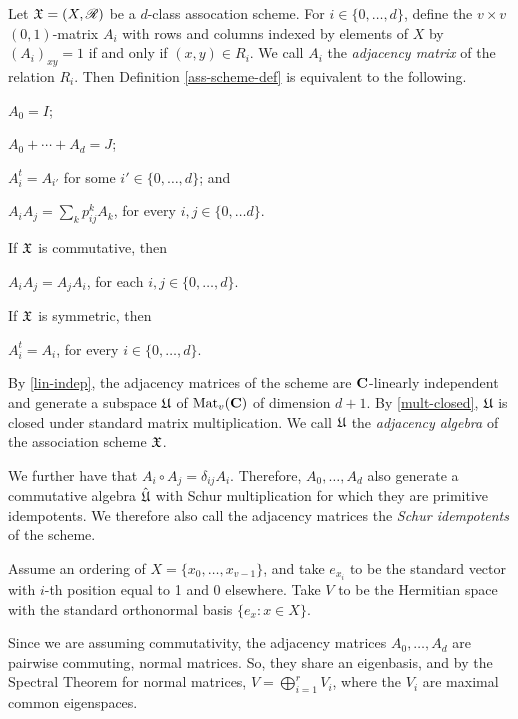 \documentclass[../../../main]{subfiles}
\begin{document}
 \begin{defin}
  Let $\mathfrak{X}=(X,\mathscr{R})$ be a $d$-class assocation scheme. For $i \in \{0, \dots, d\}$, define the $v \times v$ $(0,1)$-matrix $A_i$ with rows and columns indexed by elements of $X$ by $(A_i)_{xy} = 1$ if and only if $(x,y) \in R_i$. We call $A_i$ the {\it adjacency matrix} of the relation $R_i$. Then Definition \ref{ass-scheme-def} is equivalent to the following.
  \begin{defenum}
   \item\label{id-mat} $A_0=I$;
   \item\label{lin-indep} $A_0 + \cdots + A_d=J$;
   \item\label{trans-closed} $A_i^t=A_{i'}$ for some $i' \in \{0, \dots, d\}$; and
   \item\label{mult-closed} $A_iA_j=\sum_k p_{ij}^kA_k$, for every $i,j \in \{0, \dots d\}$.
  \end{defenum}
  If $\mathfrak{X}$ is commutative, then
  \begin{defenum}[resume]
   \item\label{commutative-scheme} $A_iA_j=A_jA_i$, for each $i,j \in \{0, \dots, d\}$.
  \end{defenum}
  If $\mathfrak{X}$ is symmetric, then
  \begin{defenum}[resume]
   \item\label{symmetric-scheme} $A_i^t=A_i$, for every $i \in \{0, \dots, d\}$.
  \end{defenum}
  By \ref{lin-indep}, the adjacency matrices of the scheme are $\mathbf{C}$-linearly independent and generate a subspace $\mathfrak{U}$ of $\text{Mat}_v(\mathbf{C})$ of dimension $d+1$. By \ref{mult-closed}, $\mathfrak{U}$ is closed under standard matrix multiplication. We call $\mathfrak{U}$ the {\it adjacency algebra} of the association scheme $\mathfrak{X}$.
  
  We further have that $A_i \circ A_j = \delta_{ij}A_i$. Therefore, $A_0, \dots, A_d$ also generate a commutative algebra $\hat {\mathfrak{U}}$ with Schur multiplication for which they are primitive idempotents. We therefore also call the adjacency matrices the {\it Schur idempotents} of the scheme.
 \end{defin}
 
 Assume an ordering of $X=\{x_0, \dots, x_{v-1}\}$, and take $e_{x_i}$ to be the standard vector with $i$-th position equal to 1 and 0 elsewhere. Take $V$ to be the Hermitian space with the standard orthonormal basis $\{e_x : x \in X\}$. 
 
 Since we are assuming commutativity, the adjacency matrices $A_0, \dots, A_d$ are pairwise commuting, normal matrices. So, they share an eigenbasis, and by the Spectral Theorem for normal matrices, $V= \bigoplus_{i=1}^r V_i$, where the $V_i$ are maximal common eigenspaces. 
 
\end{document}
